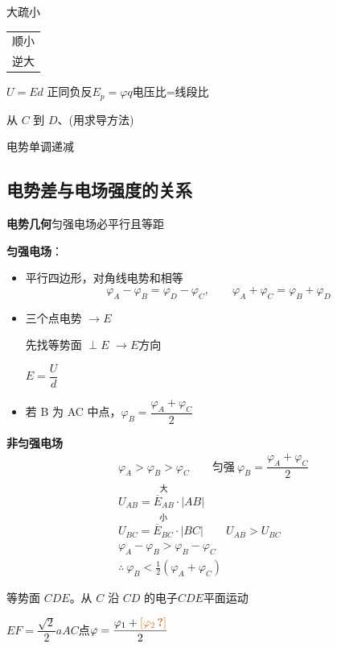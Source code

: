 大疏小\quad \begin{tabular}[t]{@{}l@{}}顺小\\逆大\end{tabular}\quad $U=Ed$ 正同负反\quad $E_{p}=\varphi q$\quad 电压比=线段比

从 $C$ 到 $D$、(用求导方法)

电势单调递减

\subsection{电势差与电场强度的关系}
\textbf{电势几何}\quad 匀强电场必平行且等距

\textbf{匀强电场}：
\begin{itemize}
\item 平行四边形，对角线电势和相等
\[
\varphi_A-\varphi_B=\varphi_D-\varphi_C,\qquad \varphi_A+\varphi_C=\varphi_B+\varphi_D
\]
\item 三个点电势 $\to E$

先找等势面 $\perp E$ $\to E$方向

$E=\dfrac{U}{d}$
\item %
若 B 为 AC 中点，$\varphi_B=\dfrac{\varphi_A+\varphi_C}{2}$
\end{itemize}

\textbf{非匀强电场}
\begin{align*}
&\varphi_A>\varphi_B>\varphi_C\qquad\text{匀强}\ \varphi_B=\dfrac{\varphi_A+\varphi_C}{2}\\
&U_{AB}=\overset{\text{大}}{\overline{E}_{AB}}\cdot|AB|\\
&U_{BC}=\overset{\text{小}}{\overline{E}_{BC}}\cdot|BC|\qquad U_{AB}>U_{BC}\\
&\varphi_A-\varphi_B>\varphi_B-\varphi_C\\
&\therefore\ \varphi_B<\tfrac{1}{2}(\varphi_A+\varphi_C)
\end{align*}

\begin{problem}
等势面 $CDE$。从 $C$ 沿 $CD$ 的电子$CDE$平面运动 %

$EF=\dfrac{\sqrt2}{2}a$\qquad $AC$点\quad $\varphi=\dfrac{\varphi_1+\unclear{\varphi_2}}{2}$ %
\end{problem}

